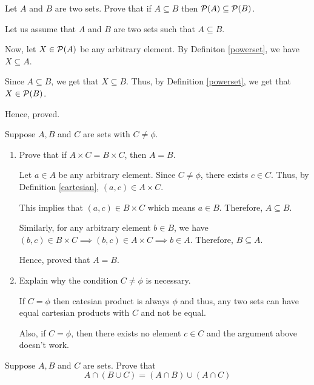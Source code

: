 \begin{problem}
	Let $A$ and $B$ are two sets. Prove that if $A \subseteq B$ then $\mathcal{P}(A) \subseteq \mathcal{P}(B)$.
\end{problem}

\begin{solution}
	Let us assume that $A$ and $B$ are two sets such that $A \subseteq B$.

	Now, let $X \in \mathcal{P}(A)$ be any arbitrary element.
	By Definiton \ref{powerset}, we have $X \subseteq A$. 

	Since $A \subseteq B$, we get that $X \subseteq B$. Thus, by Definition \ref{powerset}, we get that $X \in \mathcal{P}(B)$.

	Hence, proved.
\end{solution}

\begin{problem}
	Suppose $A, B$ and $C$ are sets with $C \neq \phi$.
	\begin{enumerate}
	\item Prove that if $A \times C = B \times C$, then $A = B$.

	\begin{solution}
		Let $a \in A$ be any arbitrary element. Since $C \neq \phi$, there exists $c \in C$. Thus, by Definition \ref{cartesian}, $(a, c) \in A \times C$.

		This implies that $(a, c) \in B \times C$ which means $a \in B$. Therefore, $A \subseteq B$.

		Similarly, for any arbitrary element $b \in B$, we have $(b, c) \in B \times C \implies (b, c) \in A \times C \implies b \in A$. Therefore, $B \subseteq A$.

		Hence, proved that $A = B$.
	\end{solution}
	
	\item Explain why the condition $C \neq \phi$ is necessary.

	\begin{solution}
		If $C = \phi$ then catesian product is always $\phi$ and thus, any two sets can have equal cartesian products with $C$ and not be equal.

		Also, if $C = \phi$, then there exists no element $c \in C$ and the argument above doesn't work.
	\end{solution}

	\end{enumerate}
\end{problem}

\begin{problem}
	Suppose $A, B$ and $C$ are sets. Prove that 
	$$A \cap (B \cup C) = (A \cap B) \cup (A \cap C)$$
\end{problem}

